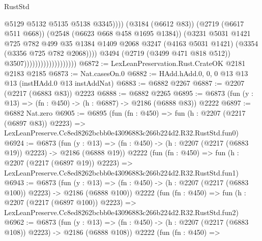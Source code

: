 \begin{lexlean}{RustStd}
\begin{coremodule}
                                                    @5129
                                                    @5132
                                                    @5135
                                                    @5138
                                                    @3345))))
                                            (@3184 (@6612 @83))
                                            (@2719 (@6617 @511 @668))
                                            (@2548 (@6623 @668 @458 @1695 @1384))
                                            (@3231
                                              @5031
                                              @1421
                                              @725
                                              @782
                                              @499
                                              @35
                                              @1384
                                              @1409
                                              @2068
                                              @3247
                                              (@4163 @5031 @1421)
                                              (@3354 (@3356 @725 @782 @2068))))
                                          @3494
                                          (@2719 (@3499 @471 @818 @512))
                                          @3507)))))))))))))))))))
@6872 := LexLeanPreservation.Rust.CrateOK @2181 @2183 @2185
@6873 := Nat.casesOn.{0}
@6882 := HAdd.hAdd.{0, 0, 0} @13 @13 @13 (instHAdd.{0} @13 instAddNat)
@6883 := @6882 @2267
@6887 := @2207 (@2217 (@6883 @83)) @2223
@6888 := @6882 @2265
@6895 := @6873 (fun (y : @13) => (fn : @450) -> (h : @6887) -> @2186 (@6888 @83)) @2222
@6897 := @6882 Nat.zero
@6905 := @6895
    (fun (fn : @450) =>
    fun (h : @2207 (@2217 (@6897 @83)) @2223) =>
    LexLeanPreserve.Cc8ed8262bcbb0e43096883c266b224d2.R32.RustStd.fun0)
@6924 := @6873
    (fun (y : @13) => (fn : @450) -> (h : @2207 (@2217 (@6883 @19)) @2223) -> @2186 (@6888 @19))
    @2222
    (fun (fn : @450) =>
    fun (h : @2207 (@2217 (@6897 @19)) @2223) =>
    LexLeanPreserve.Cc8ed8262bcbb0e43096883c266b224d2.R32.RustStd.fun1)
@6943 := @6873
    (fun (y : @13) => (fn : @450) -> (h : @2207 (@2217 (@6883 @100)) @2223) -> @2186 (@6888 @100))
    @2222
    (fun (fn : @450) =>
    fun (h : @2207 (@2217 (@6897 @100)) @2223) =>
    LexLeanPreserve.Cc8ed8262bcbb0e43096883c266b224d2.R32.RustStd.fun2)
@6962 := @6873
    (fun (y : @13) => (fn : @450) -> (h : @2207 (@2217 (@6883 @108)) @2223) -> @2186 (@6888 @108))
    @2222
    (fun (fn : @450) =>

\end{coremodule}
\end{lexlean}
